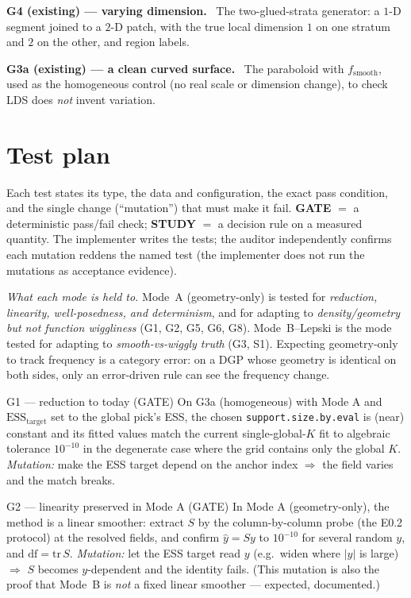 \documentclass[11pt]{article}
\newcommand{\field}[1]{\smallskip\noindent\textbf{\textsf{#1.}}\ }
\newcommand{\code}[1]{\texttt{#1}}
\begin{document}
\field{G4 (existing) --- varying dimension}
The two-glued-strata generator: a $1$-D segment joined to a $2$-D patch, with the
true local dimension $1$ on one stratum and $2$ on the other, and region labels.

\field{G3a (existing) --- a clean curved surface}
The paraboloid with $f_{\text{smooth}}$, used as the homogeneous control (no real
scale or dimension change), to check LDS does \emph{not} invent variation.

\section{Test plan}\label{sec:tests}

Each test states its type, the data and configuration, the exact pass condition, and
the single change (``mutation'') that must make it fail. \textbf{GATE} $=$ a
deterministic pass/fail check; \textbf{STUDY} $=$ a decision rule on a measured
quantity. The implementer writes the tests; the auditor independently confirms each
mutation reddens the named test (the implementer does not run the mutations as
acceptance evidence).

\noindent\emph{What each mode is held to.} Mode~A (geometry-only) is tested for
\emph{reduction, linearity, well-posedness, and determinism}, and for adapting to
\emph{density/geometry but not function wiggliness} (G1, G2, G5, G6, G8). Mode~B--Lepski
is the mode tested for adapting to \emph{smooth-vs-wiggly truth} (G3, S1). Expecting
geometry-only to track frequency is a category error: on a DGP whose geometry is identical
on both sides, only an error-driven rule can see the frequency change.

\begin{gate}{G1 --- reduction to today (GATE)}
On G3a (homogeneous) with Mode A and $\mathrm{ESS}_{\text{target}}$ set to the global
pick's ESS, the chosen \code{support.size.by.eval} is (near) constant and its fitted
values match the current single-global-$K$ fit to algebraic tolerance $10^{-10}$ in
the degenerate case where the grid contains only the global $K$. \emph{Mutation:} make
the ESS target depend on the anchor index $\Rightarrow$ the field varies and the match
breaks.
\end{gate}

\begin{gate}{G2 --- linearity preserved in Mode A (GATE)}
In Mode A (geometry-only), the method is a linear smoother: extract $S$ by the
column-by-column probe (the E0.2 protocol) at the resolved fields, and confirm
$\hat y = S y$ to $10^{-10}$ for several random $y$, and $\mathrm{df}=\mathrm{tr}\,S$.
\emph{Mutation:} let the ESS target read $y$ (e.g.\ widen where $|y|$ is large)
$\Rightarrow$ $S$ becomes $y$-dependent and the identity fails. (This mutation is also
the proof that Mode~B is \emph{not} a fixed linear smoother --- expected, documented.)
\end{gate}
\end{document}
